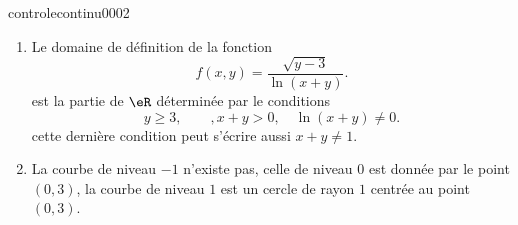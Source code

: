 \begin{corrige}{controlecontinu0002}
  \begin{enumerate}
  \item Le domaine de définition de la fonction 
    \begin{equation}
      f(x,y)=\frac{\sqrt{y-3}}{\ln (x+y)}.
    \end{equation}
est la partie de $\eR$ déterminée par le conditions 
\[
y\geq 3, \qquad, x+y > 0, \quad \ln(x+y)\neq 0.
\]
cette dernière condition peut s'écrire aussi $x+y \neq 1$.
  \item La courbe de niveau $-1$ n'existe pas, celle de niveau $0$ est donnée par le point $(0,3)$, la courbe de niveau $1$ est un cercle de rayon $1$ centrée au point $(0,3)$.  
  \end{enumerate}


\end{corrige}
